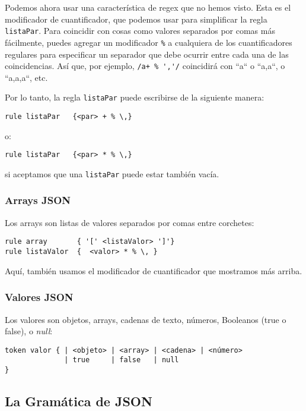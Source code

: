 Podemos ahora usar una característica de regex que no hemos
visto. Esta es el modificador de cuantificador, que podemos
usar para simplificar la regla {\tt listaPar}. Para coincidir
con cosas como valores separados por comas más fácilmente, 
puedes agregar un modificador \verb|%| a cualquiera de los
cuantificadores regulares para especificar un separador
que debe ocurrir entre cada una de las coincidencias. Así 
que, por ejemplo, \verb|/a+ % ','/| coincidirá con ``a`` o ``a,a``,
o ``a,a,a``, etc.


Por lo tanto, la regla {\tt listaPar} puede escribirse de la 
siguiente manera:

\begin{lstlisting}
rule listaPar   {<par> + % \,}
\end{lstlisting}

o:

\begin{lstlisting}
rule listaPar   {<par> * % \,}
\end{lstlisting}

si aceptamos que una {\tt listaPar} puede estar también vacía.

\subsubsection{Arrays JSON}

Los arrays son listas de valores separados por comas entre corchetes:

\begin{lstlisting}
rule array       { '[' <listaValor> ']'}
rule listaValor  {  <valor> * % \, }
\end{lstlisting}

Aquí, también usamos el modificador de cuantificador 
que mostramos más arriba.

\subsubsection{Valores JSON}

Los valores son objetos, arrays, cadenas de texto, números,
Booleanos (true o false), o \emph{null}:

\begin{lstlisting}
token valor { | <objeto> | <array> | <cadena> | <número> 
              | true     | false   | null 
}
\end{lstlisting}

\subsection{La Gramática de JSON}

